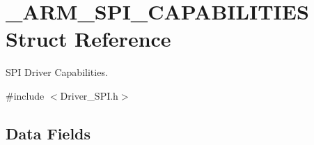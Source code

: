 \hypertarget{struct___a_r_m___s_p_i___c_a_p_a_b_i_l_i_t_i_e_s}{}\section{\+\_\+\+A\+R\+M\+\_\+\+S\+P\+I\+\_\+\+C\+A\+P\+A\+B\+I\+L\+I\+T\+I\+ES Struct Reference}
\label{struct___a_r_m___s_p_i___c_a_p_a_b_i_l_i_t_i_e_s}


S\+PI Driver Capabilities.  




{\ttfamily \#include $<$Driver\+\_\+\+S\+P\+I.\+h$>$}

\subsection*{Data Fields}
